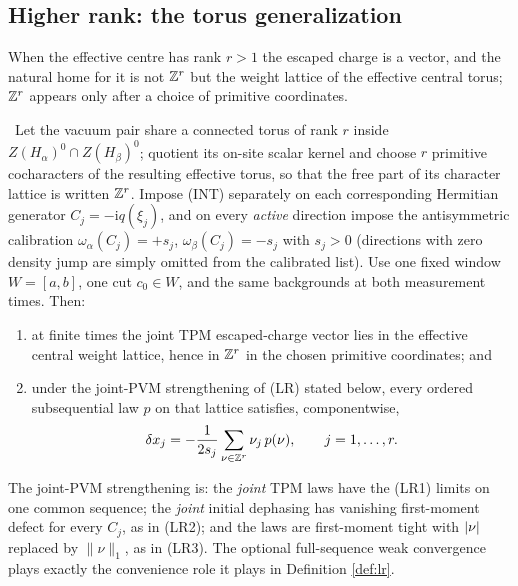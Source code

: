 \subsection{Higher rank: the torus generalization}

When the effective centre has rank $r>1$ the escaped charge is a vector, and
the natural home for it is not $\mathbb{Z}^r$ but the weight lattice of the effective
central torus; $\mathbb{Z}^r$ appears only after a choice of primitive coordinates.

\begin{theorem}
\label{thm:torus}
\statusProved\
Let the vacuum pair share a connected torus of rank $r$ inside
$Z(H_\alpha)^0\cap Z(H_\beta)^0$; quotient its on-site scalar kernel and
choose $r$ primitive cocharacters of the resulting effective torus, so that
the free part of its character lattice is written $\mathbb{Z}^r$. Impose (INT)
separately on each corresponding Hermitian generator $C_j=-\mathrm{i}q(\xi_j)$,
and on every \emph{active} direction impose the antisymmetric calibration
$\omega_\alpha(C_j)=+s_j$, $\omega_\beta(C_j)=-s_j$ with $s_j>0$ (directions
with zero density jump are simply omitted from the calibrated list). Use one
fixed window $W=[a,b]$, one cut $c_0\in W$, and the same backgrounds at both
measurement times. Then:
\begin{enumerate}
\item[(i)] at finite times the joint TPM escaped-charge vector lies in the
  effective central weight lattice, hence in $\mathbb{Z}^r$ in the chosen primitive
  coordinates; and
\item[(ii)] under the joint-PVM strengthening of (LR) stated below, every
  ordered subsequential law $p$ on that lattice satisfies, componentwise,
  \begin{equation}
    \delta x_j=-\frac{1}{2s_j}\sum_{\nu\in\mathbb{Z}^r}\nu_j\,p(\nu),
    \qquad j=1,\dots,r .
    \label{eq:torus-ledger}
  \end{equation}
\end{enumerate}
The joint-PVM strengthening is: the \emph{joint} TPM laws have the (LR1)
limits on one common sequence; the \emph{joint} initial dephasing has
vanishing first-moment defect for every $C_j$, as in (LR2); and the laws are
first-moment tight with $\lvert \nu\rvert$ replaced by $\lVert\nu\rVert_1$, as in
(LR3). The optional full-sequence weak convergence plays exactly the
convenience role it plays in Definition \ref{def:lr}.
\end{theorem}


